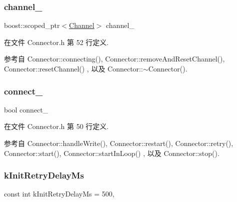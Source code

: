 \subsubsection{\texorpdfstring{channel\+\_\+}{channel\_}}
{\footnotesize\ttfamily boost\+::scoped\+\_\+ptr$<$\hyperlink{classmuduo_1_1Channel}{Channel}$>$ channel\+\_\+\hspace{0.3cm}{\ttfamily [private]}}



在文件 Connector.\+h 第 52 行定义.



参考自 Connector\+::connecting(), Connector\+::remove\+And\+Reset\+Channel(), Connector\+::reset\+Channel() , 以及 Connector\+::$\sim$\+Connector().

\mbox{\label{classmuduo_1_1Connector_ab4b9ce5dfde7fe6c5954a376aac00190}} 
\subsubsection{\texorpdfstring{connect\+\_\+}{connect\_}}
{\footnotesize\ttfamily bool connect\+\_\+\hspace{0.3cm}{\ttfamily [private]}}



在文件 Connector.\+h 第 50 行定义.



参考自 Connector\+::handle\+Write(), Connector\+::restart(), Connector\+::retry(), Connector\+::start(), Connector\+::start\+In\+Loop() , 以及 Connector\+::stop().

\mbox{\label{classmuduo_1_1Connector_abaa28ed649f43db991c045b039984aa2}} 
\subsubsection{\texorpdfstring{k\+Init\+Retry\+Delay\+Ms}{kInitRetryDelayMs}}
{\footnotesize\ttfamily const int k\+Init\+Retry\+Delay\+Ms = 500\hspace{0.3cm}{\ttfamily [static]}, {\ttfamily [private]}}



